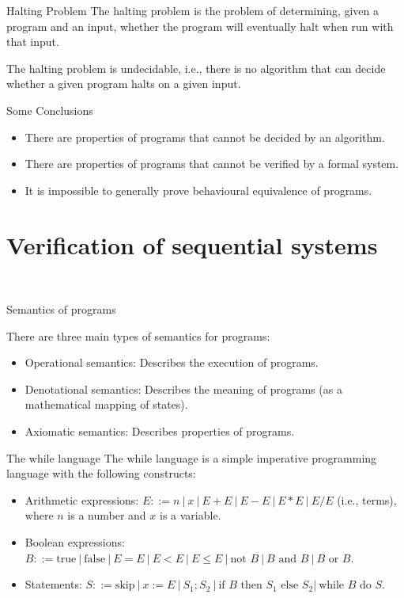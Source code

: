 \documentclass{beamer}
\begin{document}
        \begin{frame}{Halting Problem}
          The halting problem is the problem of determining, given a program and an input, whether the program will eventually halt when run with that input.
          
          The halting problem is undecidable, i.e., there is no algorithm that can decide whether a given program halts on a given input.
        \end{frame}

        \begin{frame}{Some Conclusions}
          \begin{itemize}
            \item There are properties of programs that cannot be decided by an algorithm. 
            \item There are properties of programs that cannot be verified by a formal system.
            \item It is impossible to generally prove behavioural equivalence of programs.
          \end{itemize}
        
          
        \end{frame}
\section{Verification of sequential systems}\

\begin{frame}{Semantics of programs}

  There are three main types of semantics for programs:
  \begin{itemize}
  \item Operational semantics: Describes the execution of programs.
  \item Denotational semantics: Describes the meaning of programs (as a mathematical mapping of states).
  \item Axiomatic semantics: Describes properties of programs.
  \end{itemize}
  \end{frame}
  \begin{frame}{The while language}
    The while language is a simple imperative programming language with the following constructs:
    \begin{itemize}
      \item Arithmetic expressions: $E::=n\ |\ x\ |\ E+E\ |\ E-E\ |\ E*E\ |\ E/E$ (i.e., terms), where $n$ is a number and $x$ is a variable.
      \item Boolean expressions: $B::=\text{true}\ |\ \text{false}\ |\ E=E\ |\ E<E\ |\ E\leq E\ |\ \text{not } B\ |\ B \text{ and } B\ |\ B\text{ or } B$.
      \item Statements: $S::=\text{skip}\ |\ x:=E\ |\ S_1;S_2\ |\ \text{if }B\text{ then }S_1\text{ else }S_2 |\ \text{while }B\text{ do }S$.
    \end{itemize}
    
    \end{frame}
\end{document}
